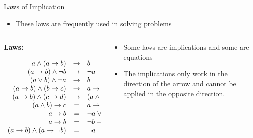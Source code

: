 \documentclass[11pt,t,pdf,xcolor=svgnames,aspectratio=169]{beamer}
\providecommand{\tightlist}{%
  \setlength{\itemsep}{5pt}\setlength{\parskip}{0pt}}
\begin{document}
\begin{frame}{Laws of Implication}
\protect\hypertarget{laws-of-implication}{}
\begin{itemize}
\tightlist
\item
  These laws are frequently used in solving problems
\end{itemize}

\begin{columns}[T]
\begin{column}{0.48\textwidth}
\textbf{Laws:}

\begin{center}
$\begin{array}{rcll}
a \land (a \to b)               & \to & b                             & \{\textrm{\textit{Modus Ponens}}\} \\
(a \to b) \land \lnot b         & \to & \lnot a                       & \{\textrm{\textit{Modus Tollens}}\} \\
(a \lor b) \land \lnot a        & \to & b                             & \{\textrm{disjunctive syllogism}\} \\
(a \to b) \land (b \to c)       & \to & a \to c                       & \{\textrm{implication chain}\} \\
(a \to b) \land (c \to d)       & \to & (a \land c) \to (b \land d)   & \{\textrm{implication combination}\} \\
(a \land b) \to c               & =   & a \to (b \to c)               & \{\textrm{Currying}\} \\
a \to b                         & =   & \lnot a \lor b                & \{\textrm{implication}\} \\
a \to b                         & =   & \lnot b \to \lnot a           & \{\textrm{contrapositive}\} \\
(a \to b) \land (a \to \lnot b) & =   & \lnot a                       & \{\textrm{absurdity}\}
\end{array}$
\end{center}
\end{column}

\begin{column}{0.48\textwidth}
\begin{itemize}
\item
  Some laws are implications and some are equations
\item
  The implications only work in the direction of the arrow and cannot be
  applied in the opposite direction.
\end{itemize}
\end{column}
\end{columns}
\end{frame}
\end{document}
